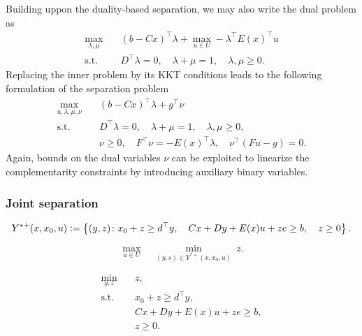 Building uppon the duality-based separation, we may also write the dual problem as 
\begin{align*}
    \max_{\lambda,\mu} \quad & (b - Cx)^\top\lambda + \max_{u\in U} -\lambda^\top E(x)^\top u \\
    \text{s.t.} \quad & D^\top\lambda = 0, \quad \lambda + \mu = 1, \quad \lambda,\mu\ge 0.
\end{align*}
Replacing the inner problem by its KKT conditions leads to the following
formulation of the separation problem
\begin{align*}
    \max_{u,\lambda,\mu,\nu} \quad & (b - Cx)^\top\lambda + g^\top\nu \\
    \text{s.t.} \quad & D^\top\lambda = 0, \quad \lambda + \mu = 1, \quad \lambda,\mu\ge 0, \\
    & \nu \ge 0, \quad F^\top\nu = -E(x)^\top\lambda, \quad \nu^\top(Fu - g) = 0.
\end{align*}
Again, bounds on the dual variables $\nu$ can be exploited to linearize the
complementarity constraints by introducing auxiliary binary variables.

\subsubsection{Joint separation}


\begin{equation*}
    Y^{*+}(x,x_0,u) \mathrel{{\mathop:}{=}} 
    \left\{
        (y,z)
    \colon
        x_0 + z \ge d^\top y, \quad
        Cx + Dy + E(x)u + ze \ge b, \quad
        z \ge 0
    \right\}.
\end{equation*}

\begin{equation*}
    \max_{u\in U} \quad \min_{(y,s)\in Y^{*+}(x,x_0,u)} \ z.
\end{equation*}


\begin{subequations}
    \begin{align}
        \min_{y,z} \quad & z, \\
        \text{s.t.} \quad & x_0 + z \ge d^\top y, \\
        & Cx + Dy + E(x)u + ze \ge b, \\
        & z \ge 0.
    \end{align}
\end{subequations}

